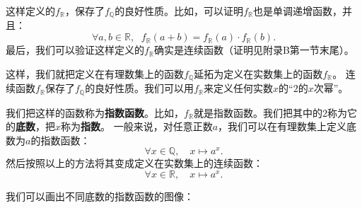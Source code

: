 \documentclass[12pt,UTF8,fontset=none]{ctexbook}
\begin{document}
这样定义的$f_{\mathbb{R}}$，保存了$f_{\mathbb{Q}}$的良好性质。比如，可以证明$f_{\mathbb{R}}$也是单调递增函数，并且：
$$ \forall a, b \in \mathbb{R}, \;\,\, f_{\mathbb{R}}(a + b) = f_{\mathbb{R}}(a) \cdot f_{\mathbb{R}}(b).$$
最后，我们可以验证这样定义的$f_{\mathbb{R}}$确实是连续函数（证明见附录B第一节末尾）。

这样，我们就把定义在有理数集上的函数$f_{\mathbb{Q}}$延拓为定义在实数集上的函数$f_{\mathbb{R}}$。
连续函数$f_{\mathbb{R}}$保存了$f_{\mathbb{Q}}$的良好性质。我们可以用$f_{\mathbb{R}}$来定义任何实数$x$的“$2$的$x$次幂”。

我们把这样的函数称为\textbf{指数函数}。比如，$f_{\mathbb{R}}$就是指数函数。我们把其中的$2$称为它的\textbf{底数}，把$x$称为\textbf{指数}。
一般来说，对任意正数$a$，我们可以在有理数集上定义底数为$a$的指数函数：
$$ \forall x\in\mathbb{Q}, \quad x\mapsto a^x.$$
然后按照以上的方法将其变成定义在实数集上的连续函数：
$$ \forall x\in\mathbb{R}, \quad x\mapsto a^x.$$

我们可以画出不同底数的指数函数的图像：
\end{document}
